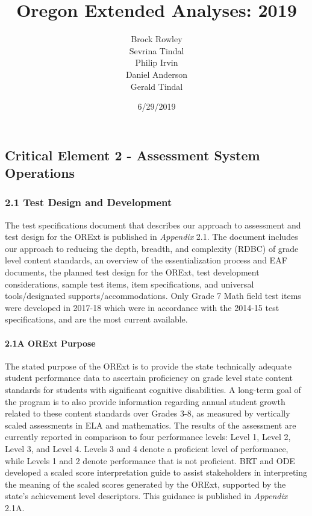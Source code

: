 \documentclass[]{article}
\title{Oregon Extended Analyses: 2019}
\author{Brock Rowley \\ Sevrina Tindal \\ Philip Irvin \\ Daniel Anderson \\ Gerald Tindal}
\date{6/29/2019}
\let\oldparagraph\paragraph
\renewcommand{\paragraph}[1]{\oldparagraph{#1}\mbox{}}
\begin{document}
\maketitle

{
\setcounter{tocdepth}{5}
\tableofcontents
}
\hypertarget{critical-element-2---assessment-system-operations}{%
\subsection{Critical Element 2 - Assessment System
Operations}\label{critical-element-2---assessment-system-operations}}

\hypertarget{test-design-and-development}{%
\subsubsection{2.1 Test Design and
Development}\label{test-design-and-development}}

The test specifications document that describes our approach to
assessment and test design for the ORExt is published in \emph{Appendix}
2.1. The document includes our approach to reducing the depth, breadth,
and complexity (RDBC) of grade level content standards, an overview of
the essentialization process and EAF documents, the planned test design
for the ORExt, test development considerations, sample test items, item
specifications, and universal tools/designated supports/accommodations.
Only Grade 7 Math field test items were developed in 2017-18 which were
in accordance with the 2014-15 test specifications, and are the most
current available.

\hypertarget{a-orext-purpose}{%
\paragraph{2.1A ORExt Purpose}\label{a-orext-purpose}}

The stated purpose of the ORExt is to provide the state technically
adequate student performance data to ascertain proficiency on grade
level state content standards for students with significant cognitive
disabilities. A long-term goal of the program is to also provide
information regarding annual student growth related to these content
standards over Grades 3-8, as measured by vertically scaled assessments
in ELA and mathematics. The results of the assessment are currently
reported in comparison to four performance levels: Level 1, Level 2,
Level 3, and Level 4. Levels 3 and 4 denote a proficient level of
performance, while Levels 1 and 2 denote performance that is not
proficient. BRT and ODE developed a scaled score interpretation guide to
assist stakeholders in interpreting the meaning of the scaled scores
generated by the ORExt, supported by the state's achievement level
descriptors. This guidance is published in \emph{Appendix} 2.1A.
\end{document}
